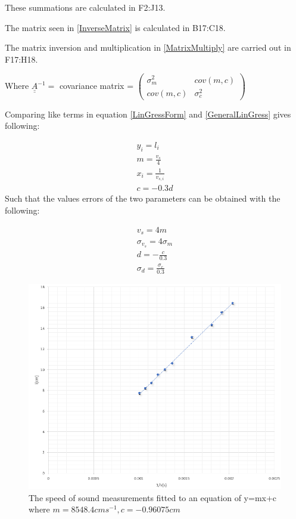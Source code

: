 \documentclass[a4paper, 12pt]{article}
\begin{document}
These summations are calculated in F2:J13.

The matrix seen in \ref{InverseMatrix} is calculated in B17:C18.

The matrix inversion and multiplication in \ref{MatrixMultiply} are carried out in F17:H18.

Where $\underline{\underline{A}}^{-1} = $ covariance matrix = 
$\begin{pmatrix}
	\sigma_{m}^2 & cov(m,c) \\
	cov(m,c) & \sigma_{c}^2 
\end{pmatrix}$

Comparing like terms in equation \ref{LinGressForm} and \ref{GeneralLinGress} gives following:

\begin{align}
	y_i=l_i\\
	m = \frac{v_s}{4}\\
	x_i=\frac{1}{v_{s,i}}\\
	c = -0.3d 
\end{align}
Such that the values errors of the two parameters can be obtained with the following:

\begin{align}
	v_s = 4m \\
	\sigma_{v_s}=4\sigma_m \\
	d =-\frac{c}{0.3} \\
	\sigma_{d} = \frac{\sigma_c}{0.3}
\end{align}

\begin{figure}[!h]
\centering
\includegraphics{1.PNG}
\caption{The speed of sound measurements fitted to an equation of y=mx+c where $m = 8548.4 cm s^{-1}, c=-0.96075 cm$}\label{1png}
\end{figure}
\end{document}
